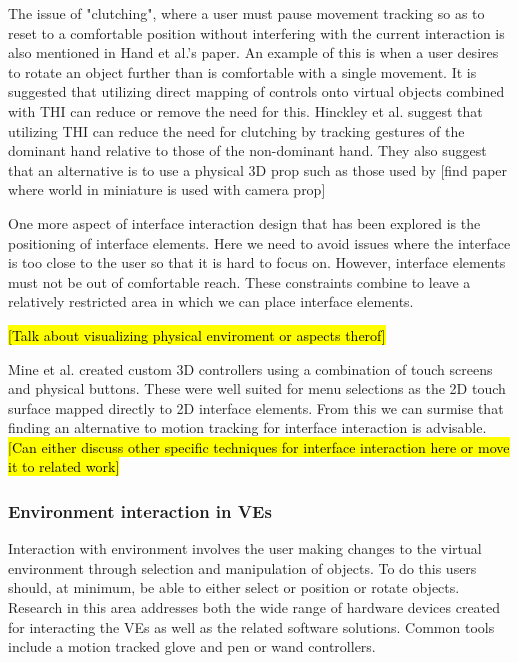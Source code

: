 \documentclass{sig-alternate-05-2015}
\begin{document}
 The issue of "clutching", where a user must pause movement tracking so as to reset to a comfortable position without interfering with the current interaction is also mentioned in Hand et al.'s paper.\cite{Hand1997} An example of this is when a user desires to rotate an object further than is comfortable with a single movement. It is suggested that utilizing direct mapping of controls onto virtual objects combined with THI can reduce or remove the need for this.\cite{Hand1997}  Hinckley et al. suggest that utilizing THI can reduce the need for clutching by tracking gestures of the dominant hand relative to those of the non-dominant hand.\cite{Hinckley1994} They also suggest that an alternative is to use a physical 3D prop such as those used by [find paper where world in miniature is used with camera prop]
 
 One more aspect of interface interaction design that has been explored is the positioning of interface elements.\cite{alger2015visual} Here we need to avoid issues where the interface is too close to the user so that it is hard to focus on. However, interface elements must not be out of comfortable reach. These constraints combine to leave a relatively restricted area in which we can place interface elements.
 
 \hl{[Talk about visualizing physical enviroment or aspects therof]}
 
 Mine et al. created custom 3D controllers using a combination of touch screens and physical buttons.\cite{Mine2014} These were well suited for menu selections as the 2D touch surface mapped directly to 2D interface elements. From this we can surmise that finding an alternative to motion tracking for interface interaction is advisable. \hl{[Can either discuss other specific techniques for interface interaction here or move it to related work]}
 
 
\subsubsection{Environment interaction in VEs}
 Interaction with environment involves the user making changes to the virtual environment through selection and manipulation of objects. To do this users should, at minimum, be able to either select or position or rotate objects\cite{Bowman2001}. Research in this area addresses both the wide range of hardware devices created for interacting the VEs as well as the related software solutions. Common tools include a motion tracked glove \cite{Zimmerman1986} and pen or wand controllers.\cite{Schultheis2012}
 
\end{document}
